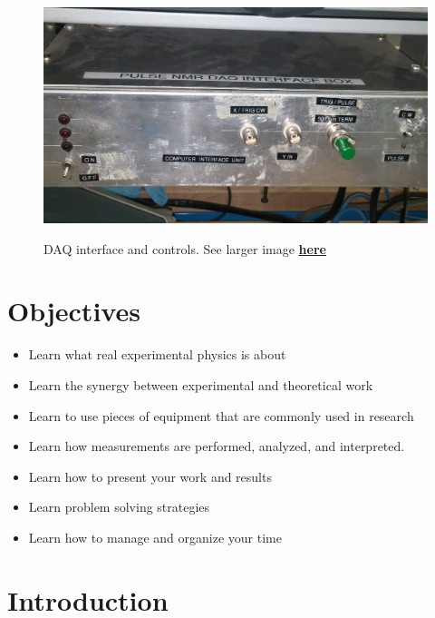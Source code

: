\documentclass{../lab}
\begin{document}
\begin{figure}
    \centering
    \href{http://experimentationlab.berkeley.edu/sites/default/files/images/NMRDAQ.jpg}{\includegraphics[width=0.8\linewidth]{images/NMRDAQ.jpg}}
    \caption{DAQ interface and controls. See larger image \href{http://experimentationlab.berkeley.edu/sites/default/files/images/NMRDAQ.jpg}{\textbf{here}}}
\end{figure}

\section{Objectives}

\begin{itemize}
    \item Learn what real experimental physics is about

    \item Learn the synergy between experimental and theoretical work

    \item Learn to use pieces of equipment that are commonly used in research

    \item Learn how measurements are performed, analyzed, and interpreted.

    \item Learn how to present your work and results

    \item Learn problem solving strategies

    \item Learn how to manage and organize your time

\end{itemize}

\section{Introduction}
\end{document}
